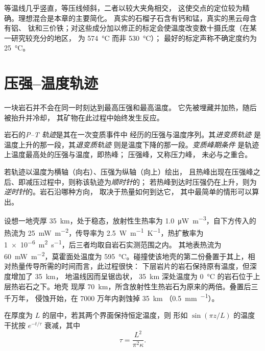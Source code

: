等温线几乎竖直，等压线倾斜，二者以较大夹角相交，
这使交点的定位较为精确。理想混合是本章的主要简化。
真实的石榴子石含有钙和锰，真实的黑云母含有铝、
钛和三价铁；对这些成分加以修正的标定会使温度改变数十摄氏度（在某一研究较充分的地区，
为 \qty{574}{\celsius} 而非 \qty{530}{\celsius}）；
最好的标定声称不确定度约为 \qty{25}{\celsius}。

\section{压强–温度轨迹}\label{sec:b2:pt-paths:paths}

一块岩石并不会在同一时刻达到最高压强和最高温度。
它先被埋藏并加热，随后被抬升并冷却，
其矿物在此过程中始终发生反应。

\begin{definition}\label{def:b2:pt-paths:paths}
岩石的\emph{P--T 轨迹}是其在一次变质事件中
经历的压强与温度序列。其\emph{进变质轨迹}
是温度上升的那一段，其\emph{退变质轨迹}
则是温度下降的那一段。\emph{变质峰期条件}
是轨迹上温度最高处的压强与温度，即热峰；
压强峰，又称压力峰，
未必与之重合。
\end{definition}

若轨迹以温度为横轴（向右）、压强为纵轴（向上）绘出，
且热峰出现在压强峰之后、即减压过程中，则称该轨迹为\emph{顺时针}的；
若热峰到达时压强仍在上升，则为\emph{逆时针}的。岩石沿哪种方向，
取决于热量如何到达它，
其中最简单的情形可以算出。

设想一地壳厚 \qty{35}{km}，处于稳态，放射性生热率为
\qty{1.0}{\micro W.m^{-3}}，自下方传入的热流为 \qty{25}{mW.m^{-2}}，传导率为
\qty{2.5}{W.m^{-1}.K^{-1}}，热扩散率为 \qty{1e-6}{m^2.s^{-1}}，后三者均取自岩石实测范围之内。
其地表热流为 \qty{60}{mW.m^{-2}}，莫霍面处温度为
\qty{595}{\celsius}。碰撞使该地壳的第二份叠置于其上，相对热量传导所需的时间而言，此过程很快：
下层岩片的岩石保持原有温度，但深度增加了 \qty{35}{km}，
地温线因而呈锯齿状，
\qty{35}{km} 深处温度为 \qty{0}{\celsius} 的岩石位于上层热岩石之下。地壳
现厚 \qty{70}{km}，所含放射性生热岩石为原来的两倍。叠置后三千万年，
侵蚀开始，在 7000 万年内剥蚀掉 \qty{35}{km}
（\qty{0.5}{mm.^{-1}}）。

\begin{proposition}[热弛豫的时间尺度]\label{prop:b2:pt-paths:relaxation}
在厚度为 $L$ 的层中，若其两个界面保持恒定温度，则
形如 $\sin(\pi z/L)$ 的温度干扰按 $e^{-t/\tau}$ 衰减，其中
\[
\tau = \frac{L^2}{\pi^2\kappa}.
\]
\end{proposition}

